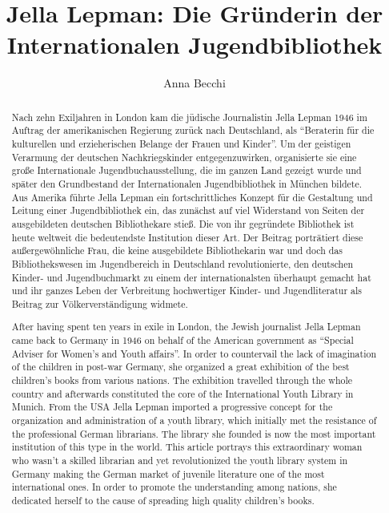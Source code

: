 \documentclass[a4paper,
fontsize=11pt,
oneside,
numbers=noperiodatend,
parskip=half-,
bibliography=totoc,
final
]{scrartcl}
\title{\LARGE{Jella Lepman: Die Gründerin der Internationalen Jugendbibliothek}} %
\author{Anna Becchi} %
\date{}
\begin{document}
\maketitle
\thispagestyle{fancyplain} 

\begin{center}
\end{center}

\begin{abstract}
\small
Nach zehn Exiljahren in London kam die jüdische Journalistin Jella
Lepman 1946 im Auftrag der amerikanischen Regierung zurück nach
Deutschland, als \enquote{Beraterin für die kulturellen und erzieherischen
Belange der Frauen und Kinder}. Um der geistigen Verarmung der deutschen
Nachkriegskinder entgegenzuwirken, organisierte sie eine große
Internationale Jugendbuchausstellung, die im ganzen Land gezeigt wurde
und später den Grundbestand der Internationalen Jugendbibliothek in
München bildete. Aus Amerika führte Jella Lepman ein fortschrittliches
Konzept für die Gestaltung und Leitung einer Jugendbibliothek ein, das
zunächst auf viel Widerstand von Seiten der ausgebildeten deutschen
Bibliothekare stieß. Die von ihr gegründete Bibliothek ist heute
weltweit die bedeutendste Institution dieser Art. Der Beitrag
porträtiert diese außergewöhnliche Frau, die keine ausgebildete
Bibliothekarin war und doch das Bibliothekswesen im Jugendbereich in
Deutschland revolutionierte, den deutschen Kinder- und Jugendbuchmarkt
zu einem der internationalsten überhaupt gemacht hat und ihr ganzes
Leben der Verbreitung hochwertiger Kinder- und Jugendliteratur als
Beitrag zur Völkerverständigung widmete.

\end{abstract}

\begin{abstract}
\small

After having spent ten years in exile in London, the Jewish journalist
Jella Lepman came back to Germany in 1946 on behalf of the American
government as \enquote{Special Adviser for Women’s and Youth affairs}. In order
to countervail the lack of imagination of the children in post-war
Germany, she organized a great exhibition of the best children’s books
from various nations. The exhibition travelled through the whole country
and afterwards constituted the core of the International Youth Library
in Munich. From the USA Jella Lepman imported a progressive concept for
the organization and administration of a youth library, which initially
met the resistance of the professional German librarians. The library
she founded is now the most important institution of this type in the
world. This article portrays this extraordinary woman who wasn’t a
skilled librarian and yet revolutionized the youth library system in
Germany making the German market of juvenile literature one of the most
international ones. In order to promote the understanding among nations,
she dedicated herself to the cause of spreading high quality children’s
books. \end{abstract}
\end{document}
